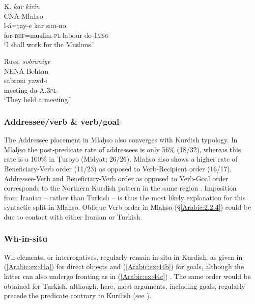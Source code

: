 \documentclass[output=paper,colorlinks,citecolor=brown,draftmode]{langscibook}
\begin{document}
\ea\label{Arabic:ex:42}
K. \textit{kar kirin}\\
CNA Mlaḥso \citep[106.§17]{Jastrow1994Mlahso} \\
\gll l-á=ṭay-e kar sim-no \\
for\textsc{-def=}muslim\textsc{-pl} labour do\textsc{-1msg} \\
\glt `I shall work for the Muslims.'
\z

\ea\label{Arabic:ex:43}
Russ. \textit{sobraniye}\\
NENA Bohtan \citep[4.2:§2]{Fox2009NABohtan} \\
\gll sabroni yawd-i \\
meeting do\textsc{-A.3pl} \\
\glt `They held a meeting.'
\z


\subsubsection{Addressee/verb \& verb/goal}\label{Arabic:3.1.4}
\largerpage

The Addressee placement in Mlaḥso also converges with Kurdish  typology. In Mlaḥso the post-predicate rate of addressees is only 56\% (18/32), whereas this rate is a 100\% in Ṭuroyo (Midyat; 26/26). Mlaḥso also shows a higher rate of Beneficiary-Verb order (11/23) as opposed to Verb-Recipient order (16/17). Addressee-Verb and Beneficiary-Verb order as opposed to Verb-Goal order corresponds to the Northern Kurdish  pattern in the same region \citep{Haig2022PostPredicateCon}. Imposition from Iranian – rather than Turkish – is thus the most likely explanation for this syntactic split in Mlaḥso. Oblique-Verb order in Mlaḥso (§\ref{Arabic:2.2.4}) could be due to contact with either Iranian or Turkish.

\subsubsection{Wh-in-situ}

Wh-elements, or interrogatives, regularly remain in-situ in Kurdish, as given in (\ref{Arabic:ex:44a}) for direct objects and (\ref{Arabic:ex:44b})  for goals, although the latter can also undergo fronting as in (\ref{Arabic:ex:44c}) \citep[339]{Haig2022PostPredicateCon}. The same order would be obtained for Turkish, although, here, most arguments, including goals, regularly precede the predicate contrary to Kurdish (see ).
\end{document}
